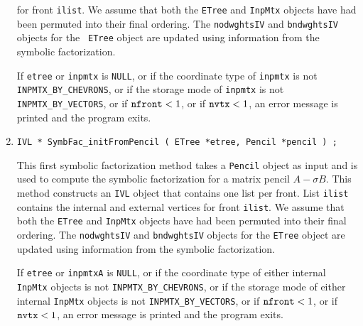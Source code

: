 \begin{enumerate}
for front {\tt ilist}.
We assume that both the {\tt ETree} and {\tt InpMtx} objects have
had been permuted into their final ordering.
The {\tt nodwghtsIV} and {\tt bndwghtsIV} objects for the {\tt
ETree} object are updated using information from the symbolic
factorization.
\par {}
If {\tt etree} or {\tt inpmtx} is {\tt NULL},
or if the coordinate type of {\tt inpmtx} is not {\tt
INPMTX\_BY\_CHEVRONS},
or if the storage mode of {\tt inpmtx} is not {\tt
INPMTX\_BY\_VECTORS},
or if ${\tt nfront} < 1$,
or if ${\tt nvtx} < 1$,
an error message is printed and the program exits.
\item
\begin{verbatim}
IVL * SymbFac_initFromPencil ( ETree *etree, Pencil *pencil ) ;
\end{verbatim}
This first symbolic factorization method takes a {\tt Pencil} object
as input and is used to compute the symbolic factorization for
a matrix pencil $A - \sigma B$.
This method constructs an {\tt IVL} object that contains one list
per front. 
List {\tt ilist} contains the internal and external vertices
for front {\tt ilist}.
We assume that both the {\tt ETree} and {\tt InpMtx} objects have
had been permuted into their final ordering.
The {\tt nodwghtsIV} and {\tt bndwghtsIV} objects for the 
{\tt ETree} object are updated using information from the symbolic
factorization.
\par {}
If {\tt etree} or {\tt inpmtxA} is {\tt NULL},
or if the coordinate type of either internal {\tt InpMtx} objects 
is not {\tt INPMTX\_BY\_CHEVRONS},
or if the storage mode of either internal {\tt InpMtx} objects 
is not {\tt INPMTX\_BY\_VECTORS},
or if ${\tt nfront} < 1$,
or if ${\tt nvtx} < 1$,
an error message is printed and the program exits.
\end{enumerate}
